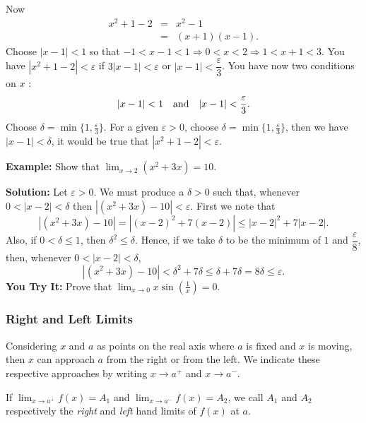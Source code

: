 \documentclass[titlepage,a4paper,12pt]{report}
\begin{document}
\noindent Now 
\begin{eqnarray*}
x^2+1-2 &=& x^2-1 \\
 &=& (x+1)(x-1).
 \end{eqnarray*}
 Choose $|x-1|<1$ so that $-1<x-1<1\Rightarrow 0<x<2\Rightarrow 1<x+1<3$. You have $|x^2+1-2|<\varepsilon$ if $3|x-1|<\varepsilon$ or $|x-1|<\dfrac{\varepsilon}{3}$. You have now two conditions on $x$ :
 \begin{equation*}
 |x-1|<1 \quad \hbox{and} \quad |x-1|<\frac{\varepsilon}{3}.
 \end{equation*}
 Choose $\delta =\min \{1,\frac{\varepsilon}{3}\}$. For a given $\varepsilon >0$, choose $\delta =\min \{1,\frac{\varepsilon}{3}\}$, then we have $|x-1|<\delta$, it would be true that $|x^2+1-2|<\varepsilon$.
 
 \noindent \textbf{Example:} Show that $\displaystyle \lim _{x\rightarrow 2} (x^2+3x)=10$.
 
 \noindent \textbf{Solution:} Let $\varepsilon >0$. We must produce a $\delta >0$ such that,  whenever $0<|x-2|<\delta$ then $|(x^2+3x)-10|<\varepsilon$. First we note that 
 \begin{equation*}
 |(x^2+3x)-10|=|(x-2)^2+7(x-2)| \leq |x-2|^2 +7|x-2|.
 \end{equation*}
 Also, if $0<\delta \leq 1$, then $\delta ^2 \leq \delta$. Hence, if we take $\delta$ to be the minimum of $1$ and $\dfrac{\varepsilon}{8}$, then, whenever $0<|x-2|<\delta$, 
 \begin{equation*}
 |(x^2+3x)-10|<\delta ^2 +7\delta \leq \delta +7\delta =8\delta \leq \varepsilon .
 \end{equation*}
 \textbf{You Try It:} Prove that $\displaystyle \lim _{x\rightarrow 0}x\sin \left(\frac{1}{x}\right)=0$.
 \subsubsection{Right and Left Limits}
 Considering $x$  and $a$ as points on the real axis where $a$ is fixed and $x$ is moving, then $x$ can approach $a$ from the right or from the left. We indicate these respective approaches by writing $x\rightarrow a^+$ and $x\rightarrow a^-$.
 
 \noindent If $\displaystyle \lim _{x\rightarrow a^+} f(x)=A_1$ and $\displaystyle \lim _{x\rightarrow a^-} f(x)=A_2$, we call $A_1$ and $A_2$ respectively the \textit{right} and \textit{left} hand limits of $f(x)$ at $a$.
 
\end{document}
